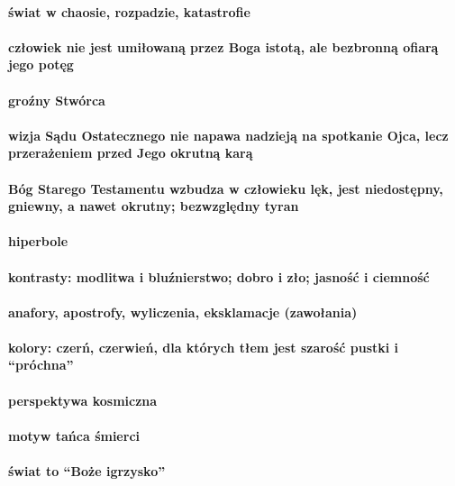 \documentclass[a4paper]{article}
\begin{document}
    \paragraph*{świat w chaosie, rozpadzie, katastrofie}
    \paragraph*{człowiek nie jest umiłowaną przez Boga istotą, ale bezbronną ofiarą jego potęg}
    \paragraph*{groźny Stwórca}
    \paragraph*{wizja Sądu Ostatecznego nie napawa nadzieją na spotkanie Ojca, lecz przerażeniem przed Jego okrutną karą}
    \paragraph*{Bóg Starego Testamentu wzbudza w człowieku lęk, jest niedostępny, gniewny, a nawet okrutny; bezwzględny tyran}
    \paragraph*{hiperbole}
    \paragraph*{kontrasty: modlitwa i bluźnierstwo; dobro i zło; jasność i ciemność}
    \paragraph*{anafory, apostrofy, wyliczenia, eksklamacje (zawołania)}
    \paragraph*{kolory: czerń, czerwień, dla których tłem jest szarość pustki i ``próchna''}
    \paragraph*{perspektywa kosmiczna}
    \paragraph*{motyw tańca śmierci}
    \paragraph*{świat to ``Boże igrzysko''}
\end{document}

